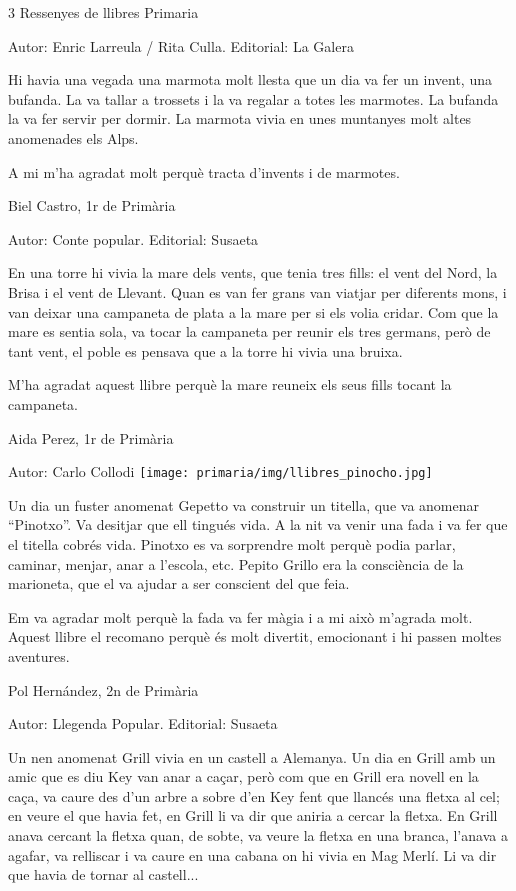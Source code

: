 \begin{shortnews}
{3} %
{Ressenyes de llibres}
{}
{Primaria}

{
Autor: Enric Larreula / Rita Culla.   Editorial: La Galera 

Hi havia una vegada una marmota molt llesta que un dia va fer un invent, una bufanda. La va tallar a trossets i la va regalar a totes les marmotes. La bufanda la va fer servir per dormir. La marmota vivia en unes muntanyes molt altes anomenades els Alps.

A mi m’ha agradat molt perquè tracta d’invents i de marmotes.
									
Biel Castro, 1r de Primària
}

{
Autor: Conte popular.   Editorial: Susaeta

En una torre hi vivia la mare dels vents, que tenia tres fills: el vent del Nord, la Brisa i el vent de Llevant. Quan es van fer grans van viatjar per diferents mons, i van deixar una campaneta de plata a la mare per si els volia cridar.  Com que la mare es sentia sola, va tocar la campaneta per reunir els tres germans, però de tant vent, el poble es pensava que a la torre hi vivia una bruixa.

M’ha agradat aquest llibre perquè la mare reuneix els seus fills tocant la campaneta.
									
Aida Perez, 1r de Primària
}

{
Autor: Carlo Collodi      
\noindent\texttt{[image: primaria/img/llibres\_pinocho.jpg]}

Un dia un fuster anomenat Gepetto va construir un titella, que va anomenar  “Pinotxo”. Va desitjar que  ell tingués vida. A la nit va venir una fada i va fer que el titella cobrés vida. Pinotxo es va sorprendre molt perquè podia parlar, caminar, menjar, anar a l’escola, etc. Pepito Grillo era la consciència de la marioneta, que el va ajudar a ser conscient del que feia. 

Em va agradar molt perquè la fada va fer màgia i a mi això m’agrada molt. Aquest llibre el recomano perquè és molt divertit, emocionant i hi passen moltes aventures.

Pol Hernández,  2n de Primària
}

{
Autor: Llegenda Popular.    Editorial: Susaeta  

Un nen anomenat Grill vivia en un castell a Alemanya. Un dia en Grill amb un amic que es diu Key van anar a caçar, però com que en Grill era novell  en la caça, va caure des d’un arbre a sobre d’en Key fent que llancés una fletxa al cel; en veure el que havia fet, en Grill li va dir que aniria a cercar la fletxa. En Grill anava cercant la fletxa quan, de sobte, va veure la fletxa en una branca, l’anava a agafar,  va relliscar i va caure en una cabana on hi vivia en Mag Merlí.  Li va dir que havia de  tornar al castell...    

}
\end{shortnews}
